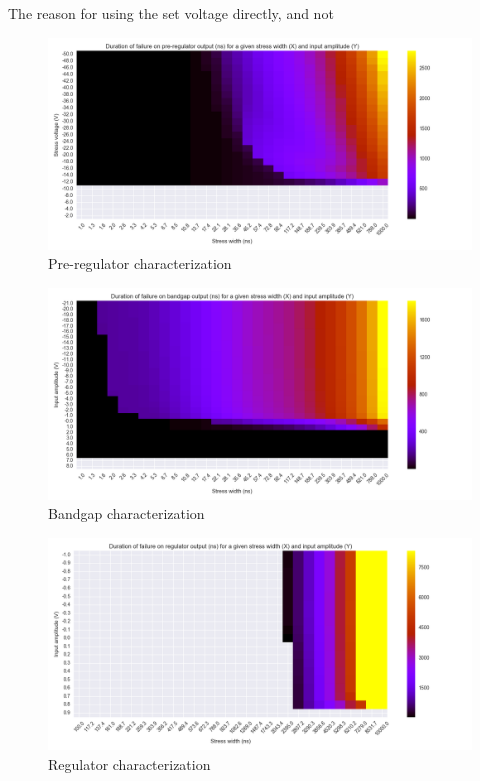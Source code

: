 The reason for using the set voltage directly, and not

\begin{figure}[!htbp]
  \centering
  \includegraphics[width=\textwidth]{src/4/figures/preregulator_cz.png}
  \caption{Pre-regulator characterization}
  \label{pre_regu_wb}
\end{figure}

\begin{figure}[!htbp]
  \centering
  \includegraphics[width=\textwidth]{src/4/figures/bandgap_cz.png}
  \caption{Bandgap characterization}
  \label{bandgap_wb}
\end{figure}

\begin{figure}[!htbp]
  \centering
  \includegraphics[width=\textwidth]{src/4/figures/regulator_cz.png}
  \caption{Regulator characterization}
  \label{regu_wb}
\end{figure}


